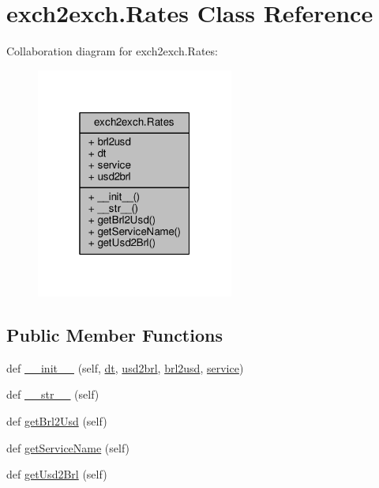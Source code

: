 \hypertarget{classexch2exch_1_1_rates}{}\section{exch2exch.\+Rates Class Reference}
\label{classexch2exch_1_1_rates}


Collaboration diagram for exch2exch.\+Rates\+:\nopagebreak
\begin{figure}[H]
\begin{center}
\leavevmode
\includegraphics[width=184pt]{classexch2exch_1_1_rates__coll__graph}
\end{center}
\end{figure}
\subsection*{Public Member Functions}
\begin{DoxyCompactItemize}
\item 
def \hyperlink{classexch2exch_1_1_rates_a2868d5631b08e767680f1d0cd0a6420a}{\+\_\+\+\_\+init\+\_\+\+\_\+} (self, \hyperlink{classexch2exch_1_1_rates_acb12f83bce4393714ec30351a1d636c2}{dt}, \hyperlink{classexch2exch_1_1_rates_ab79ad6e4a42ca358e6b39c825a4b8a0b}{usd2brl}, \hyperlink{classexch2exch_1_1_rates_acc018dea09e825e18e91c73c5c63ab78}{brl2usd}, \hyperlink{classexch2exch_1_1_rates_a94c1394b9259d6a7c8f3c12bbd20e685}{service})
\item 
def \hyperlink{classexch2exch_1_1_rates_aa1f9446c881b72b6229b05a65b84474c}{\+\_\+\+\_\+str\+\_\+\+\_\+} (self)
\item 
def \hyperlink{classexch2exch_1_1_rates_a2ff10f54055363d36aef301f29068dad}{get\+Brl2\+Usd} (self)
\item 
def \hyperlink{classexch2exch_1_1_rates_a41aec7438ab7b0c8ba17bc3502ee335e}{get\+Service\+Name} (self)
\item 
def \hyperlink{classexch2exch_1_1_rates_af5f9e36738bb2288ac39a8bca48b4282}{get\+Usd2\+Brl} (self)
\end{DoxyCompactItemize}
